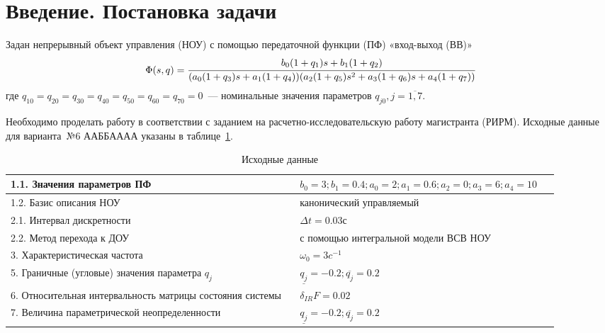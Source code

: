 \section*{Введение. Постановка задачи}

Задан непрерывный объект управления (НОУ) с помощью передаточной функции (ПФ) «вход-выход (ВВ)»
\begin{equation}\label{eq_pf0}
	\Phi (s, q) = \cfrac{b_0 (1 + q_1) s + b_1 (1 + q_2)}{(a_0 (1+q_3)s + a_1 (1+q_4))(a_2 (1+q_5) s^2 + a_3 (1 + q_6) s + a_4 (1 + q_7))}
\end{equation}
где $q_{10}=q_{20}=q_{30}=q_{40}=q_{50}=q_{60}=q_{70}=0$~--- номинальные значения параметров $q_{j0}, j = \overline{1,7}$.

Необходимо проделать работу в соответствии с заданием на расчетно-исследовательскую  работу магистранта (РИРМ). Исходные данные для варианта~№6 ААББАААА указаны в таблице~\ref{problem_data}.

\begin{table}[h!]
	\caption{Исходные данные}
	\begin{tabular}{|p{0.5\linewidth}|p{0.4\linewidth}|}
\hline
1.1. Значения параметров ПФ & 
$b_0 = 3; b_1 = 0.4; a_0=2; a_1 = 0.6; a_2 = 0; a_3 = 6; a_4 = 10$
\\
\hline
1.2. Базис описания НОУ & канонический управляемый
\\
\hline
2.1. Интервал дискретности & $\Delta{t} = 0.03$с\\
\hline
2.2. Метод перехода к ДОУ & с помощью интегральной модели ВСВ НОУ
\\
\hline
3. Характеристическая частота  & $\omega_0 = 3 c^{-1}$\\
\hline
5. Граничные (угловые) значения параметра $q_j$  & $\underline{q_j} = -0.2; \overline{q_j} = 0.2$ \\ 
\hline
6. Относительная интервальность матрицы состояния системы & $\delta_{IR} F = 0.02$\\
\hline
7. Величина параметрической неопределенности  & $\underline{q_j} = -0.2; \overline{q_j} = 0.2$\\
\hline
	\end{tabular}
	\label{problem_data}
\end{table}


\newpage